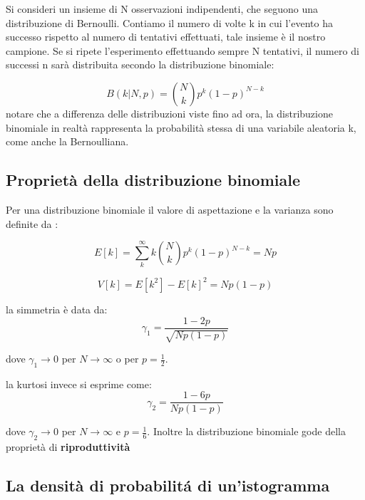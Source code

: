 \documentclass[11pt,a4paper]{book}
\begin{document}
Si consideri un insieme di N osservazioni indipendenti, che seguono una distribuzione di Bernoulli. Contiamo il numero di volte k in cui l'evento ha successo rispetto al numero di tentativi effettuati, tale insieme \`{e} il nostro campione. Se si ripete l'esperimento effettuando sempre N tentativi, il numero di successi n sar\`{a} distribuita secondo la distribuzione binomiale:

\begin{equation*}
	B(k \vert N,p) = \binom{N}{k}p^k(1-p)^{N-k}
\end{equation*} 
\newline
notare che a differenza delle distribuzioni viste fino ad ora, la distribuzione binomiale in realt\`{a} rappresenta la probabilit\`{a} stessa di una variabile aleatoria k, come anche la Bernoulliana.

\subsection{Propriet\`{a} della distribuzione binomiale}

Per una distribuzione binomiale il valore di aspettazione e la varianza sono definite da :

\begin{equation}
	E[k] = \sum_{k}^\infty k \binom{N}{k}p^k(1-p)^{N-k} = Np
\end{equation}

\begin{equation}
	V[k] = E[k^2] - E[k]^2 = Np(1-p)
\end{equation}

\noindent la simmetria \`{e} data da:
\begin{equation}
	\gamma_1 = \dfrac{1-2p}{\sqrt{Np(1-p)}}
\end{equation}

dove $\gamma_1 \rightarrow 0 $ per $N \rightarrow \infty $ o per $p = \frac{1}{2}$.\newline

la kurtosi invece si esprime come:
\begin{equation}
	\gamma_2 = \dfrac{1-6p}{Np(1-p)}
\end{equation}

dove $\gamma_2 \rightarrow 0$ per $N \rightarrow \infty$ e $p = \frac{1}{6}$.
Inoltre la distribuzione binomiale gode della propriet\`{a} di \textbf{riproduttivit\`{a}}
\subsection{La densit\`{a} di probabilit\'{a} di un'istogramma}
\end{document}
